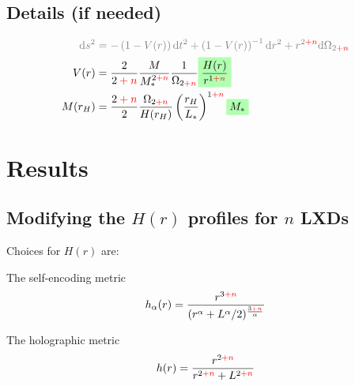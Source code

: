 \documentclass[xcolor=dvipsnames]{beamer}
\newcommand{\highlight}[1]{%
  \colorbox{green!30}{$\displaystyle#1$}}
\renewcommand{\d}{\mathrm{d}}
\newcommand*{\mathcolor}{}
\def\mathcolor#1#{\mathcoloraux{#1}}
\newcommand*{\mathcoloraux}[3]{%
  \protect\leavevmode
  \begingroup
    \color#1{#2}#3%
  \endgroup
}
\newcommand{\pn}{\mathcolor{red}{+ n}}
\newcommand{\gray}{ \color{gray} }
\newcommand{\black}{ \color{black} }
\begin{document}
\subsection{Details (if needed)}
\begin{frame}
\begin{align}
\gray \d s^2 &\gray=  -\left( 1 - V(r) \right) \d t^2
+ \left( 1 - V(r) \right)^{-1} \d r^2 + r^{2\pn} \d \Omega_{2\pn} 
\\ \black
V(r) &= \frac{2}{2\pn} \frac{M}{M_*^{2\pn}} \frac{1}{\Omega_{2\pn}} \highlight{ \frac{H(r)}{r^{1\pn}} }
\\
M(r_H) &= \frac{2\pn}{2} \frac{ \Omega_{2\pn} }{ H(r_H) }
\left( \frac{r_H}{L_*} \right)^{1\pn} \highlight{ M_* }
\end{align}
\end{frame}

\section{Results}
\subsection{Modifying the $H(r)$ profiles for $n$ LXDs}
\begin{frame}
Choices for $H(r)$ are:

\begin{block}{The self-encoding metric}
\vspace{-10pt}
\begin{equation*}
h_\alpha(r) = \frac{r^{3\pn}}{(r^\alpha + L^\alpha / 2)^{
\frac{3\pn}{\alpha}
}}
\end{equation*}
\end{block}

\begin{block}{The holographic metric}
\vspace{-10pt}
\begin{equation*}
h(r) = \frac{r^{2\pn}}{r^{2\pn} + L^{2\pn}}
\end{equation*}
\end{block}


\end{frame}
\end{document}
